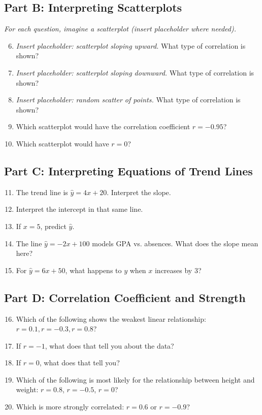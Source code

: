 \documentclass[12pt]{article}
\begin{document}
\subsection*{Part B: Interpreting Scatterplots}
\textit{For each question, imagine a scatterplot (insert placeholder where needed).}
\begin{enumerate}
  \setcounter{enumi}{5}
  \item \textit{Insert placeholder: scatterplot sloping upward.}  
  What type of correlation is shown?
  \item \textit{Insert placeholder: scatterplot sloping downward.}  
  What type of correlation is shown?
  \item \textit{Insert placeholder: random scatter of points.}  
  What type of correlation is shown?
  \item Which scatterplot would have the correlation coefficient \(r = -0.95\)?
  \item Which scatterplot would have \(r = 0\)?
\end{enumerate}

\subsection*{Part C: Interpreting Equations of Trend Lines}
\begin{enumerate}
  \setcounter{enumi}{10}
  \item The trend line is \(\hat{y} = 4x + 20\). Interpret the slope.
  \item Interpret the intercept in that same line.
  \item If \(x = 5\), predict \(\hat{y}\).
  \item The line \(\hat{y} = -2x + 100\) models GPA vs. absences. What does the slope mean here?
  \item For \(\hat{y} = 6x + 50\), what happens to \(y\) when \(x\) increases by 3?
\end{enumerate}

\subsection*{Part D: Correlation Coefficient and Strength}
\begin{enumerate}
  \setcounter{enumi}{15}
  \item Which of the following shows the weakest linear relationship: \(r = 0.1, r = -0.3, r = 0.8\)?
  \item If \(r = -1\), what does that tell you about the data?
  \item If \(r = 0\), what does that tell you?
  \item Which of the following is most likely for the relationship between height and weight: \(r = 0.8\), \(r = -0.5\), \(r = 0\)?
  \item Which is more strongly correlated: \(r = 0.6\) or \(r = -0.9\)?
\end{enumerate}
\end{document}
